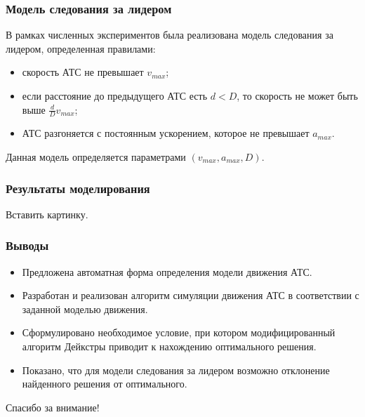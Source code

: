 \documentclass{beamer}
\begin{document}
\begin{frame}\frametitle{Модель следования за лидером}
  В рамках численных экспериментов была реализована модель следования за лидером, определенная правилами:
  \begin{itemize}
  \item скорость АТС не превышает $v_{max}$;
  \item если расстояние до предыдущего АТС есть $d < D$, то скорость не может быть выше $\frac{d}{D}v_{max}$;
  \item АТС разгоняется с постоянным ускорением, которое не превышает $a_{max}$.
  \end{itemize}
  Данная модель определяется параметрами $(v_{max}, a_{max}, D)$.
\end{frame}


\begin{frame}\frametitle{Результаты моделирования}
  Вставить картинку.
\end{frame}



\begin{frame}\frametitle{Выводы}
  \begin{itemize}
  \item Предложена автоматная форма определения модели движения АТС.
  \item Разработан и реализован алгоритм симуляции движения АТС в соответствии с заданной моделью движения.
  \item Сформулировано необходимое условие, при котором модифицированный алгоритм Дейкстры приводит к нахождению оптимального решения.
  \item Показано, что для модели следования за лидером возможно отклонение найденного решения от оптимального.
  \end{itemize}
\end{frame}


\begin{frame}[standout]
Спасибо за внимание!
\end{frame}
\end{document}
